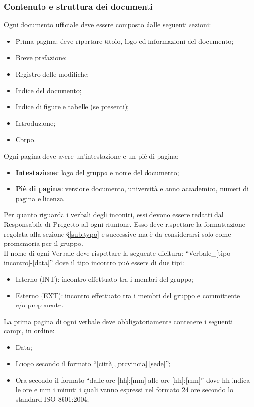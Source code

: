 {{	\subsubsection{Contenuto e struttura dei documenti}{
		\label{sub:content}
		Ogni documento ufficiale deve essere composto dalle seguenti sezioni:
		\begin{itemize}
			\item Prima pagina: deve riportare titolo, logo ed informazioni del documento;
			\item Breve prefazione;
			\item Registro delle modifiche;
			\item Indice del documento;
			\item Indice di figure e tabelle (se presenti);
			\item Introduzione;
			\item Corpo.
		\end{itemize}
		Ogni pagina deve avere un'intestazione e un piè di pagina:
		\begin{itemize}
			\item \textbf{Intestazione}: logo del gruppo e nome del documento;
			\item \textbf{Piè di pagina}: versione documento, università e anno accademico, numeri di pagina e licenza.
		\end{itemize}
		Per quanto riguarda i verbali degli incontri, essi devono essere redatti dal Responsabile di Progetto ad ogni riunione. Esso deve rispettare la formattazione regolata alla sezione \S\ref{sub:typo} e successive ma è da considerarsi solo come promemoria per il gruppo.\\
		Il nome di ogni Verbale deve rispettare la seguente dicitura: “Verbale\_[tipo incontro]-[data]” dove il tipo incontro può essere di due tipi:
		\begin{itemize}
			\item Interno (INT): incontro effettuato tra i membri del gruppo;
			\item Esterno (EXT): incontro effettuato tra i membri del gruppo e committente e/o proponente.
		\end{itemize}
		La prima pagina di ogni verbale deve obbligatoriamente contenere i seguenti campi, in ordine:
		\begin{itemize}
			\item Data;
			\item Luogo secondo il formato “[città],[provincia],[sede]”;
			\item Ora secondo il formato “dalle ore [hh]:[mm] alle ore [hh]:[mm]” dove hh indica le ore e mm i minuti i quali vanno espressi nel formato 24 ore secondo lo standard ISO 8601:2004;

\end{itemize}}}}
